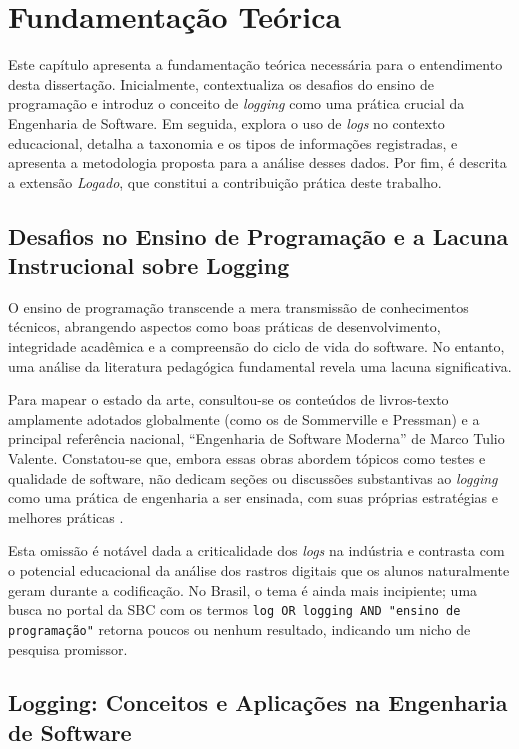 \chapter{Fundamentação Teórica}
\label{cap:fundamentacao}

Este capítulo apresenta a fundamentação teórica necessária para o entendimento desta dissertação. Inicialmente, contextualiza os desafios do ensino de programação e introduz o conceito de \textit{logging} como uma prática crucial da Engenharia de Software. Em seguida, explora o uso de \textit{logs} no contexto educacional, detalha a taxonomia e os tipos de informações registradas, e apresenta a metodologia proposta para a análise desses dados. Por fim, é descrita a extensão \textit{Logado}, que constitui a contribuição prática deste trabalho.

\section{Desafios no Ensino de Programação e a Lacuna Instrucional sobre Logging}
\label{sec:desafios-lacuna}

O ensino de programação transcende a mera transmissão de conhecimentos técnicos, abrangendo aspectos como boas práticas de desenvolvimento, integridade acadêmica e a compreensão do ciclo de vida do software. No entanto, uma análise da literatura pedagógica fundamental revela uma lacuna significativa.

Para mapear o estado da arte, consultou-se os conteúdos de livros-texto amplamente adotados globalmente (como os de Sommerville e Pressman) e a principal referência nacional, ``Engenharia de Software Moderna'' de Marco Tulio Valente. Constatou-se que, embora essas obras abordem tópicos como testes e qualidade de software, não dedicam seções ou discussões substantivas ao \textit{logging} como uma prática de engenharia a ser ensinada, com suas próprias estratégias e melhores práticas \cite{gu2022logging}.

Esta omissão é notável dada a criticalidade dos \textit{logs} na indústria e contrasta com o potencial educacional da análise dos rastros digitais que os alunos naturalmente geram durante a codificação. No Brasil, o tema é ainda mais incipiente; uma busca no portal da SBC com os termos \texttt{log OR logging AND "ensino de programação"} retorna poucos ou nenhum resultado, indicando um nicho de pesquisa promissor.

\section{Logging: Conceitos e Aplicações na Engenharia de Software}
\label{sec:conceitos-logging}

